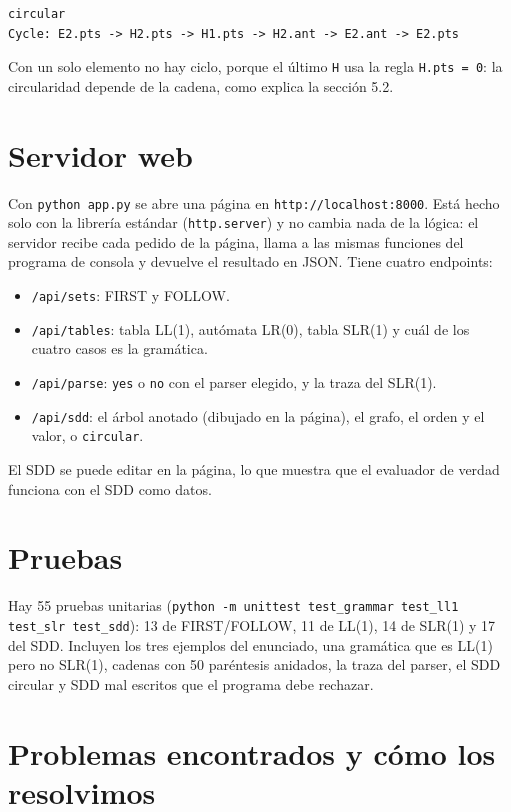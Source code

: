 \documentclass[11pt,a4paper]{article}
\newcommand{\code}[1]{\texttt{#1}}
\begin{document}
\begin{Verbatim}
circular
Cycle: E2.pts -> H2.pts -> H1.pts -> H2.ant -> E2.ant -> E2.pts
\end{Verbatim}

Con un solo elemento no hay ciclo, porque el último \code{H} usa la regla \code{H.pts = 0}: la circularidad depende de la cadena, como explica la sección 5.2.

\section{Servidor web}\label{sec:web}

Con \code{python app.py} se abre una página en \code{http://localhost:8000}. Está hecho solo con la librería estándar (\code{http.server}) y no cambia nada de la lógica: el servidor recibe cada pedido de la página, llama a las mismas funciones del programa de consola y devuelve el resultado en JSON. Tiene cuatro endpoints:

\begin{itemize}
  \item \code{/api/sets}: FIRST y FOLLOW.
  \item \code{/api/tables}: tabla LL(1), autómata LR(0), tabla SLR(1) y cuál de los cuatro casos es la gramática.
  \item \code{/api/parse}: \code{yes} o \code{no} con el parser elegido, y la traza del SLR(1).
  \item \code{/api/sdd}: el árbol anotado (dibujado en la página), el grafo, el orden y el valor, o \code{circular}.
\end{itemize}

El SDD se puede editar en la página, lo que muestra que el evaluador de verdad funciona con el SDD como datos.

\section{Pruebas}

Hay 55 pruebas unitarias (\code{python -m unittest test\_grammar test\_ll1 test\_slr test\_sdd}): 13 de FIRST/FOLLOW, 11 de LL(1), 14 de SLR(1) y 17 del SDD. Incluyen los tres ejemplos del enunciado, una gramática que es LL(1) pero no SLR(1), cadenas con 50 paréntesis anidados, la traza del parser, el SDD circular y SDD mal escritos que el programa debe rechazar.

\section{Problemas encontrados y cómo los resolvimos}
\end{document}
